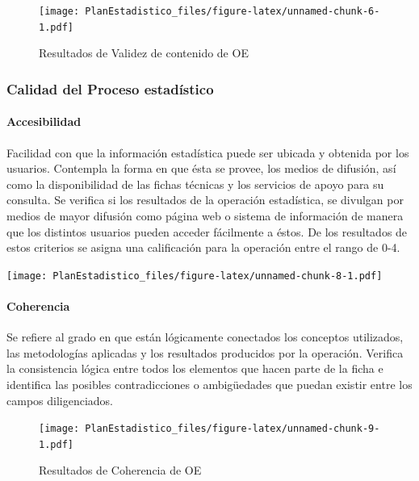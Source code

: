 \documentclass[
]{book}
\begin{document}
\begin{figure}
\centering
\texttt{[image: PlanEstadistico\_files/figure-latex/unnamed-chunk-6-1.pdf]}
\caption{\label{fig:unnamed-chunk-6}Resultados de Validez de contenido de OE}
\end{figure}

\hypertarget{calidad-del-proceso-estaduxedstico}{%
\subsubsection{Calidad del Proceso estadístico}\label{calidad-del-proceso-estaduxedstico}}

\hypertarget{accesibilidad}{%
\paragraph{Accesibilidad}\label{accesibilidad}}

Facilidad con que la información estadística puede ser ubicada y obtenida por los usuarios. Contempla la forma en que ésta se provee, los medios de difusión, así como la disponibilidad de las fichas técnicas y los servicios de apoyo para su consulta. Se verifica si los
resultados de la operación estadística, se divulgan por medios de mayor difusión como página web o sistema de información de manera que los distintos usuarios pueden acceder fácilmente a éstos. De los resultados de estos criterios se asigna una calificación para la operación entre el rango de 0-4.

\texttt{[image: PlanEstadistico\_files/figure-latex/unnamed-chunk-8-1.pdf]}

\hypertarget{coherencia}{%
\paragraph{Coherencia}\label{coherencia}}

Se refiere al grado en que están lógicamente conectados los conceptos utilizados, las metodologías aplicadas y los resultados producidos por la operación. Verifica la consistencia lógica entre todos los elementos que hacen parte de la ficha e identifica las posibles contradicciones o ambigüedades que puedan existir entre los campos diligenciados.

\begin{figure}
\centering
\texttt{[image: PlanEstadistico\_files/figure-latex/unnamed-chunk-9-1.pdf]}
\caption{\label{fig:unnamed-chunk-9}Resultados de Coherencia de OE}
\end{figure}
\end{document}
